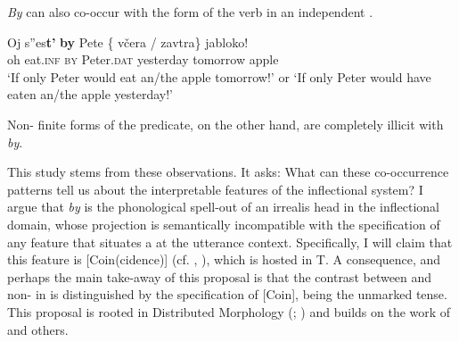 \documentclass[output=paper,modfonts,newtxmath,hidelinks,]{langscibook}
\begin{document}
\noindent \textit{By} can also co-occur with the  form of the verb in an independent .

\ea \label{10:ex3}
\gll Oj s”es\textbf{t’} \textbf{by} Pete \{\hspace{-2pt} včera / zavtra\} jabloko!\\
     oh eat.\textsc{inf} \textsc{by} Peter.\textsc{dat} {} yesterday {} tomorrow apple\\
\glt `If only Peter would eat an/the apple tomorrow!' or
\glt `If only Peter would have eaten an/the apple yesterday!'\\\hfill \citep[10]{Asarina2006}
\z

\noindent Non- finite forms of the predicate, on the other hand, are completely illicit with \textit{by}.

\ea \label{10:ex4}
	\z
\z

\noindent This study stems from these observations. It asks: What can these co-occurrence patterns tell us about the interpretable features of the  inflectional system? I argue that \textit{by} is the phonological spell-out of an irrealis head in the  inflectional domain, whose projection is semantically incompatible with the specification of any feature that situates a  at the utterance context. Specifically, I will claim that this feature is [Coin(cidence)] (cf. \citealt{RitterWiltschko2005}, \citealt{RitterWiltschko2009}), which is hosted in T. A consequence, and perhaps the main take-away of this proposal is that the contrast between  and non- in  is distinguished by the specification of [Coin],  being the unmarked tense. This proposal is rooted in Distributed Morphology (\citealt{HalleMarantz1993}; \citealt{EmbickNoyer2007}) and builds on the  work of \citet{Cowper2002,Cowper2005} and others.
\end{document}
